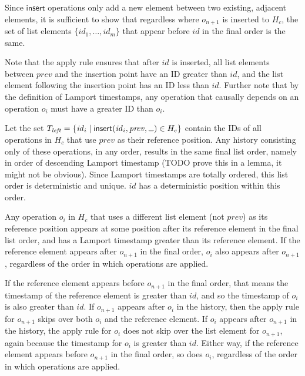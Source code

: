 \documentclass[10pt,journal,compsoc]{IEEEtran}
\newcommand{\placeholder}{%
  \makebox[0.7em]{%
    \kern.07em
    \vrule height.3ex
    \hrulefill
    \vrule height.3ex
    \kern.07em
  }%
}
\begin{document}
Since $\mathsf{insert}$ operations only add a new element between two existing, adjacent elements, it is sufficient to show that regardless where $o_{n+1}$ is inserted to $H_c$, the set of list elements $\{\mathit{id}_1, \dots, \mathit{id}_m\}$ that appear before $\mathit{id}$ in the final order is the same.

Note that the $\mathrm{apply}$ rule ensures that after $\mathit{id}$ is inserted, all list elements between $\mathit{prev}$ and the insertion point have an ID greater than $\mathit{id}$, and the list element following the insertion point has an ID less than $\mathit{id}$. Further note that by the definition of Lamport timestamps, any operation that causally depends on an operation $o_i$ must have a greater ID than $o_i$.

Let the set $T_\mathit{left} = \{\mathit{id}_i \mid \mathsf{insert}(\mathit{id}_i, \mathit{prev}, \placeholder) \in H_c\}$ contain the IDs of all operations in $H_c$ that use $\mathit{prev}$ as their reference position. Any history consisting only of these operations, in any order, results in the same final list order, namely in order of descending Lamport timestamp (TODO prove this in a lemma, it might not be obvious). Since Lamport timestamps are totally ordered, this list order is deterministic and unique. $\mathit{id}$ has a deterministic position within this order.

Any operation $o_i$ in $H_c$ that uses a different list element (not $\mathit{prev}$) as its reference position appears at some position after its reference element in the final list order, and has a Lamport timestamp greater than its reference element. If the reference element appears after $o_{n+1}$ in the final order, $o_i$ also appears after $o_{n+1}$, regardless of the order in which operations are applied.

If the reference element appears before $o_{n+1}$ in the final order, that means the timestamp of the reference element is greater than $\mathit{id}$, and so the timestamp of $o_i$ is also greater than $\mathit{id}$. If $o_{n+1}$ appears after $o_i$ in the history, then the apply rule for $o_{n+1}$ skips over both $o_i$ and the reference element. If $o_i$ appears after $o_{n+1}$ in the history, the apply rule for $o_i$ does not skip over the list element for $o_{n+1}$, again because the timestamp for $o_i$ is greater than $\mathit{id}$. Either way, if the reference element appears before $o_{n+1}$ in the final order, so does $o_i$, regardless of the order in which operations are applied.
\end{document}

